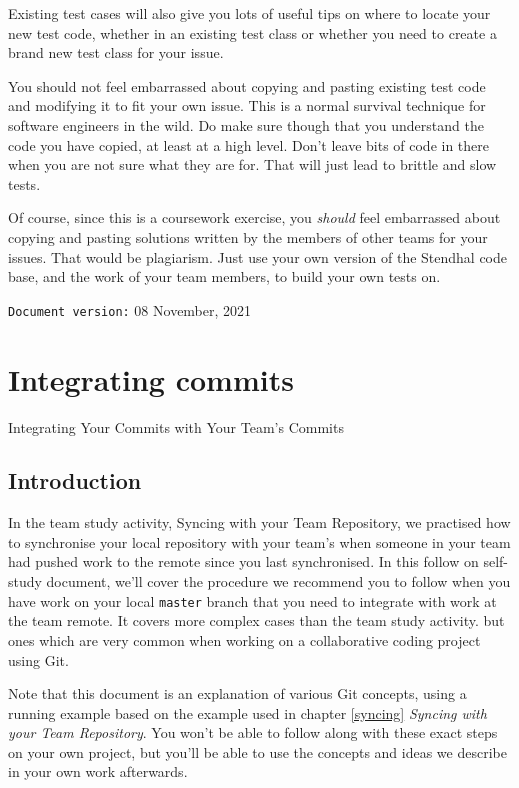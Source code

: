 \documentclass[
]{book}
\begin{document}
Existing test cases will also give you lots of useful tips on where to locate your new test code, whether in an existing test class or whether you need to create a brand new test class for your issue.

You should not feel embarrassed about copying and pasting existing test code and modifying it to fit your own issue. This is a normal survival technique for software engineers in the wild. Do make sure though that you understand the code you have copied, at least at a high level. Don't leave bits of code in there when you are not sure what they are for. That will just lead to brittle and slow tests.

Of course, since this is a coursework exercise, you \emph{should} feel embarrassed about copying and pasting solutions written by the members of other teams for your issues. That would be plagiarism. Just use your own version of the Stendhal code base, and the work of your team members, to build your own tests on.

\texttt{Document\ version:} 08 November, 2021

\hypertarget{committing}{%
\chapter{Integrating commits}\label{committing}}

Integrating Your Commits with Your Team's Commits

\hypertarget{commintro}{%
\section{Introduction}\label{commintro}}

In the team study activity, Syncing with your Team Repository, we practised how to synchronise your local repository with your team's when someone in your team had pushed work to the remote since you last synchronised. In this follow on self-study document, we'll cover the procedure we recommend you to follow when you have work on your local \texttt{master} branch that you need to integrate with work at the team remote. It covers more complex cases than the team study activity. but ones which are very common when working on a collaborative coding project using Git.

Note that this document is an explanation of various Git concepts, using a running example based on the example used in chapter \ref{syncing} \emph{Syncing with your Team Repository}. You won't be able to follow along with these exact steps on your own project, but you'll be able to use the concepts and ideas we describe in your own work afterwards.
\end{document}
